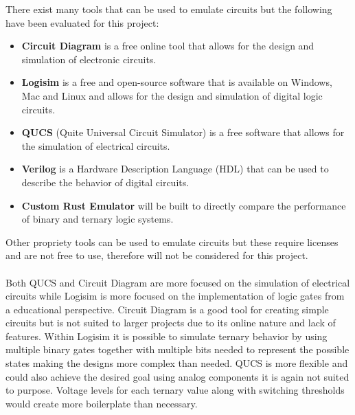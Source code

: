 \documentclass[12pt]{article}
\begin{document}
There exist many tools that can be used to emulate circuits but the following have been evaluated for this project:
\begin{itemize}
    \item \textbf{Circuit Diagram} is a free online tool that allows for the design and simulation of electronic circuits.
    \item \textbf{Logisim} is a free and open-source software that is available on Windows, Mac and Linux and allows for the design and simulation of digital logic circuits.
    \item \textbf{QUCS} (Quite Universal Circuit Simulator) is a free software that allows for the simulation of electrical circuits.
    \item \textbf{Verilog} is a Hardware Description Language (HDL) that can be used to describe the behavior of digital circuits.
    \item \textbf{Custom Rust Emulator} will be built to directly compare the performance of binary and ternary logic systems.
\end{itemize}
Other propriety tools can be used to emulate circuits but these require licenses and are not free to use, 
therefore will not be considered for this project.\\
\\
Both QUCS and Circuit Diagram are more focused on the simulation of electrical circuits while Logisim is more focused on the implementation of 
logic gates from a educational perspective. Circuit Diagram is a good tool for creating simple circuits but is not suited to larger 
projects due to its online nature and lack of features. Within Logisim it is possible to simulate ternary behavior by using multiple binary gates together 
with multiple bits needed to represent the possible states making the designs more complex than needed. QUCS is more flexible and could also 
achieve the desired goal using analog components it is again not suited to purpose. Voltage levels for each ternary value along with switching 
thresholds would create more boilerplate than necessary.\\
\end{document}

